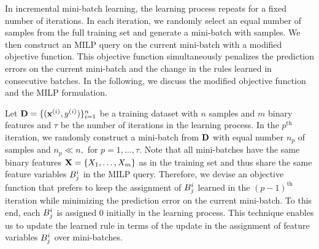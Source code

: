 In incremental mini-batch learning, the learning process repeats for a fixed number of iterations. In each iteration, we randomly select an equal number of samples from the full training set and generate a mini-batch with samples.  We then construct an MILP query on the current mini-batch with a modified objective function. This objective function simultaneously penalizes the prediction errors
on the current mini-batch and the change in the rules learned in consecutive batches.  
In the following, we discuss the modified objective function and the  MILP formulation.










Let $ \mathbf{D} = \{(\mathbf{x}^{(i)}, y^{(i)})\}_{i=1}^n $ be a training dataset with $ n $ samples and $ m $ binary features and $ \tau $ be the number of iterations in the learning process. In the $ p^\text{th} $ iteration, we randomly construct a mini-batch from $ \mathbf{D} $ with equal number $ n_p  $ of  samples and $ n_p \ll n, $  for $ p=1,\dots, \tau $. Note that all mini-batches have the same  binary features $ \mathbf{X} =\{X_1, \dots, X_m\} $ as in the  training set and thus share the same feature variables $ B_j^i $ in the MILP query. Therefore, we devise an objective function that prefers to keep the  assignment of $ B_j^i $ learned in the $ (p-1)^\text{th} $ iteration while minimizing the prediction error on  the current mini-batch. To this end, each $ B_j^i $ is assigned $ 0 $ initially in the learning process.  This technique  enables us to update the learned rule in terms of the update in the assignment of feature variables $ B_j^i $ over mini-batches. 


